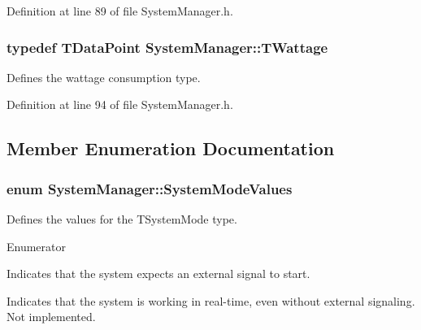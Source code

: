 Definition at line 89 of file System\-Manager.\-h.

\hypertarget{class_system_manager_a924f6502f78c31bbf5f462f9554d4fc5}{
\subsubsection[{T\-Wattage}]{\setlength{\rightskip}{0pt plus 5cm}typedef {\bf T\-Data\-Point} {\bf System\-Manager\-::\-T\-Wattage}}}\label{class_system_manager_a924f6502f78c31bbf5f462f9554d4fc5}


Defines the wattage consumption type. 



Definition at line 94 of file System\-Manager.\-h.



\subsection{Member Enumeration Documentation}
\hypertarget{class_system_manager_a073873362e7861f8a0368bb62144d4ca}{
\subsubsection[{System\-Mode\-Values}]{\setlength{\rightskip}{0pt plus 5cm}enum {\bf System\-Manager\-::\-System\-Mode\-Values}}}\label{class_system_manager_a073873362e7861f8a0368bb62144d4ca}


Defines the values for the T\-System\-Mode type. 

\begin{Desc}
\item[Enumerator]\par
\begin{description}
\item[{\em 
\hypertarget{class_system_manager_a073873362e7861f8a0368bb62144d4caa55cdecfd6754c9496bbe9560aa6f181e}{Simulation\-Mode}\label{class_system_manager_a073873362e7861f8a0368bb62144d4caa55cdecfd6754c9496bbe9560aa6f181e}
}]Indicates that the system expects an external signal to start. \item[{\em 
\hypertarget{class_system_manager_a073873362e7861f8a0368bb62144d4caac1092623b7154136da8721ebf7402357}{Real\-Time\-Mode}\label{class_system_manager_a073873362e7861f8a0368bb62144d4caac1092623b7154136da8721ebf7402357}
}]Indicates that the system is working in real-\/time, even without external signaling. Not implemented. \end{description}
\end{Desc}


